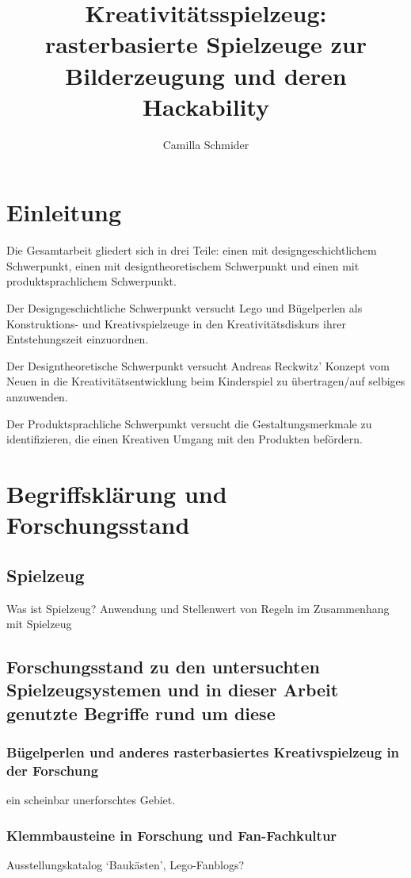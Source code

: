 \documentclass[11pt,a4paper,twoside]{scrreprt}
\title{Kreativitätsspielzeug: rasterbasierte Spielzeuge zur Bilderzeugung und deren Hackability}
\author{Camilla Schmider}
\begin{document}
\maketitle
\tableofcontents

\chapter{Einleitung}
Die Gesamtarbeit gliedert sich in drei Teile: einen mit designgeschichtlichem Schwerpunkt, einen mit designtheoretischem Schwerpunkt und einen mit produktsprachlichem Schwerpunkt. 

Der Designgeschichtliche Schwerpunkt versucht Lego und Bügelperlen als Konstruktions- und Kreativspielzeuge in den Kreativitätsdiskurs ihrer Entstehungszeit einzuordnen.

Der Designtheoretische Schwerpunkt versucht Andreas Reckwitz' Konzept vom Neuen in die Kreativitätsentwicklung beim Kinderspiel zu übertragen/auf selbiges anzuwenden.

Der Produktsprachliche Schwerpunkt versucht die Gestaltungsmerkmale zu identifizieren, die einen Kreativen Umgang mit den Produkten befördern.

\iffalse

\chapter{Begriffsklärung und Forschungsstand}

	\section{Spielzeug}
	Was ist Spielzeug? Anwendung und Stellenwert von Regeln im Zusammenhang mit Spielzeug
	
	\section{Forschungsstand zu den untersuchten Spielzeugsystemen und in dieser Arbeit genutzte Begriffe rund um diese}
		\subsection{Bügelperlen und anderes rasterbasiertes Kreativspielzeug in der Forschung}
		ein scheinbar unerforschtes Gebiet.
		\subsection{Klemmbausteine in Forschung und Fan-Fachkultur}
		Ausstellungskatalog `Baukästen', Lego-Fanblogs?
\end{document}
